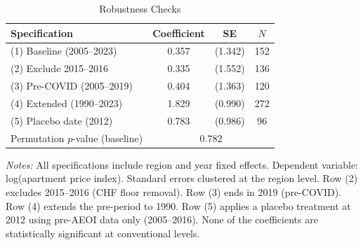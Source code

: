 \begin{table}[t]
\centering
\caption{Robustness Checks}
\label{tab:robustness}
\begin{threeparttable}
\begin{tabular}{lccc}
\toprule
Specification & Coefficient & SE & $N$ \\
\midrule
(1) Baseline (2005--2023) & 0.357 & (1.342) & 152 \\
(2) Exclude 2015--2016 & 0.335 & (1.552) & 136 \\
(3) Pre-COVID (2005--2019) & 0.404 & (1.363) & 120 \\
(4) Extended (1990--2023) & 1.829 & (0.990) & 272 \\
(5) Placebo date (2012) & 0.783 & (0.986) & 96 \\
\addlinespace
Permutation $p$-value (baseline) & \multicolumn{3}{c}{0.782} \\
\bottomrule
\end{tabular}
\begin{tablenotes}[flushleft]\footnotesize
\item \textit{Notes:} All specifications include region and year fixed effects. Dependent variable: log(apartment price index). Standard errors clustered at the region level. Row (2) excludes 2015--2016 (CHF floor removal). Row (3) ends in 2019 (pre-COVID). Row (4) extends the pre-period to 1990. Row (5) applies a placebo treatment at 2012 using pre-AEOI data only (2005--2016). None of the coefficients are statistically significant at conventional levels.
\end{tablenotes}
\end{threeparttable}
\end{table}
